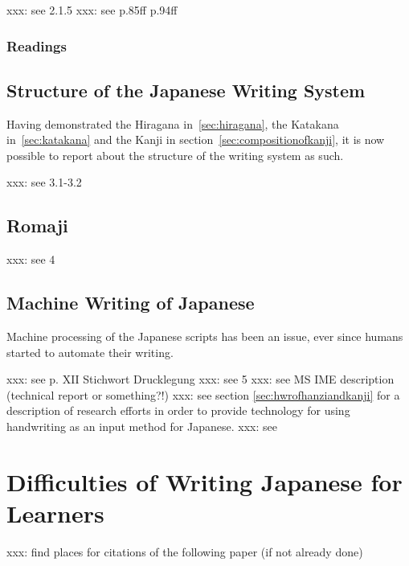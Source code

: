 xxx: see  2.1.5
xxx: see  p.85ff p.94ff

\subsubsection{Readings}
\label{sec:readings}

\subsection{Structure of the Japanese Writing System}
\label{sec:structureofwritingsystem}
Having demonstrated the Hiragana in~\ref{sec:hiragana}, the Katakana 
in~\ref{sec:katakana} and the Kanji in section~\ref{sec:compositionofkanji}, 
it is now possible to report about the structure of the writing system as such.

xxx: see  3.1-3.2

\subsection{Romaji }
\label{sec:romaji}
xxx: see  4

\subsection{Machine Writing of Japanese}
\label{sec:machinewritingofjapanese}

Machine processing of the Japanese scripts has been an issue, ever since humans
started to automate their writing.

xxx: see  p. XII Stichwort Drucklegung
xxx: see  5
xxx: see MS IME description (technical report or something?!)
xxx: see section \ref{sec:hwrofhanziandkanji} for a description of research 
efforts in order to provide technology for using handwriting as an input method 
for Japanese.
xxx: see 


\section{Difficulties of Writing Japanese for Learners}
\label{sec:writingjapanesedifficulties}


xxx: find places for citations of the following paper (if not already done)
